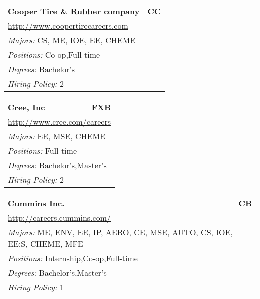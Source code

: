 \documentclass[twoside]{article}
\begin{document}
\begin{center}
\begin{multicols}{3}
\begin{FlushLeft}
\begin{minipage}{\columnwidth}
\end{minipage}
 
\begin{minipage}{\columnwidth}\begin{tabularx}{.95\columnwidth}{Xr}
                 {\Large\bf Cooper Tire \& Rubber company} & {\Large\bf CC}\\
    \multicolumn{2}{p{.95\columnwidth}}{\url{http://www.coopertirecareers.com}}\\
    \multicolumn{2}{p{.95\columnwidth}}{\emph{Majors:} CS, ME, IOE, EE, CHEME}\\
    \multicolumn{2}{p{.95\columnwidth}}{\emph{Positions:} Co-op,Full-time}\\
    \multicolumn{2}{p{.95\columnwidth}}{\emph{Degrees:} Bachelor's}\\
    \multicolumn{2}{p{.95\columnwidth}}{\emph{Hiring Policy:} 2}\\
    \end{tabularx}
    
\end{minipage}
 
\begin{minipage}{\columnwidth}\begin{tabularx}{.95\columnwidth}{Xr}
                 {\Large\bf Cree, Inc} & {\Large\bf FXB}\\
    \multicolumn{2}{p{.95\columnwidth}}{\url{http://www.cree.com/careers}}\\
    \multicolumn{2}{p{.95\columnwidth}}{\emph{Majors:} EE, MSE, CHEME}\\
    \multicolumn{2}{p{.95\columnwidth}}{\emph{Positions:} Full-time}\\
    \multicolumn{2}{p{.95\columnwidth}}{\emph{Degrees:} Bachelor's,Master's}\\
    \multicolumn{2}{p{.95\columnwidth}}{\emph{Hiring Policy:} 2}\\
    \end{tabularx}
    
\end{minipage}
 
\begin{minipage}{\columnwidth}\begin{tabularx}{.95\columnwidth}{Xr}
                 {\Large\bf Cummins Inc.} & {\Large\bf CB}\\
    \multicolumn{2}{p{.95\columnwidth}}{\url{http://careers.cummins.com/}}\\
    \multicolumn{2}{p{.95\columnwidth}}{\emph{Majors:} ME, ENV, EE, IP, AERO, CE, MSE, AUTO, CS, IOE, EE:S, CHEME, MFE}\\
    \multicolumn{2}{p{.95\columnwidth}}{\emph{Positions:} Internship,Co-op,Full-time}\\
    \multicolumn{2}{p{.95\columnwidth}}{\emph{Degrees:} Bachelor's,Master's}\\
    \multicolumn{2}{p{.95\columnwidth}}{\emph{Hiring Policy:} 1}\\
    \end{tabularx}
    

\end{minipage}
\end{FlushLeft}
\end{multicols}
\end{center}
\end{document}
